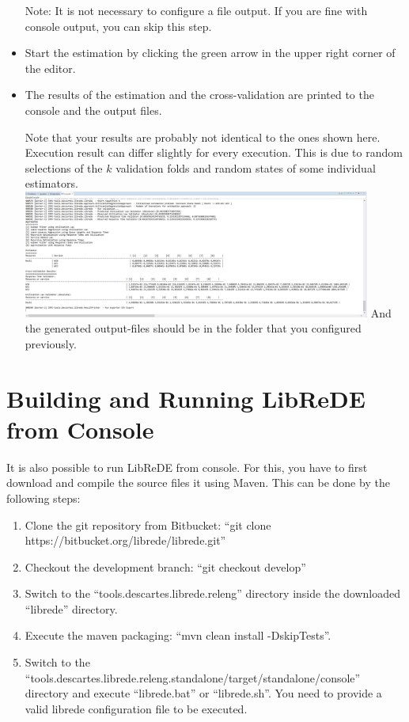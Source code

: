 \begin{itemize}
     Note: It is not necessary to configure a file output. If you are fine with console output, you can skip this step. \newline	
	\item Start the estimation by clicking the green arrow in the upper right corner of the editor.
	\item The results of the estimation and the cross-validation are printed to the console and the output files. 
    
    Note that your results are probably not identical to the ones shown here. Execution result can differ slightly for every execution. This is due to random selections of the $k$ validation folds and random states of some individual estimators.  \newline
			\newline
			\includegraphics[width=0.9\textwidth]{screenshots/Screenshot27}	\newline
			\newline
			And the generated output-files should be in the folder that you configured previously. \newline
			\newline
	\end{itemize}

\section{Building and Running LibReDE from Console}

It is also possible to run LibReDE from console.
For this, you have to first download and compile the source files it using Maven.
This can be done by the following steps:

\begin{enumerate}
    \item Clone the git repository from Bitbucket: ``git clone https://bitbucket.org/librede/librede.git''
    \item Checkout the development branch: ``git checkout develop''
    \item Switch to the ``tools.descartes.librede.releng'' directory inside the downloaded ``librede'' directory.
    \item Execute the maven packaging: ``mvn clean install -DskipTests''.
    \item Switch to the ``tools.descartes.librede.releng.standalone/target/standalone/console'' directory and execute ``librede.bat'' or ``librede.sh''. You need to provide a valid librede configuration file to be executed.
\end{enumerate}



